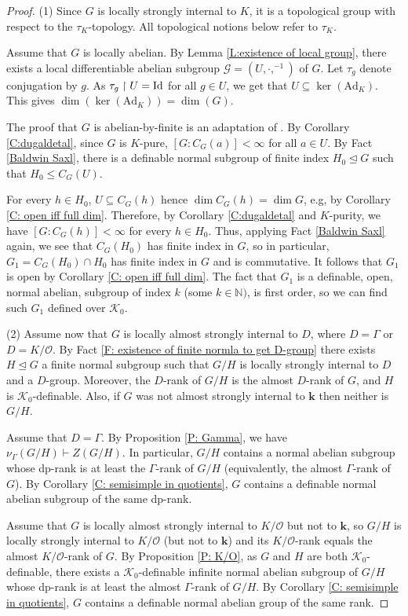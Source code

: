 \documentclass[11pt]{amsart}
\theoremstyle{definition}
\newcommand{\Nn}{{\mathbb{N}}}
\newcommand{\bk}{\textbf{k}}
\newcommand{\CK}{{\mathcal K}}
\newcommand{\CO}{{\mathcal O}}
\newcommand{\CG}{{\mathcal G}}
\newcommand{\0}{\emptyset}
\newcommand{\rest}{\upharpoonright}
\newcommand{\ad}{\mathrm{Ad}}
\def\sub{\subseteq}
\begin{document}
\begin{proof} 
(1)   Since $G$ is locally strongly internal to $K$, it is a topological group with respect to the $\tau_K$-topology. All topological notions below refer to $\tau_K$.

 Assume that $G$ is locally abelian.
     By Lemma \ref{L:existence of local group}, there exists a local differentiable abelian subgroup $\CG=(U,\cdot, ^{-1})$ of $G$. Let $\tau_g$ denote conjugation by $g$. As $\tau_g\rest U=\id$ for all $g\in U$, we get that $U\subseteq \ker(\ad_K)$. This gives $\dim(\ker(\ad_K))=\dim(G)$.   
     
     The proof that $G$ is abelian-by-finite is an  adaptation of \cite[Proposition 2.3]{PiYao}. By Corollary \ref{C:dugaldetal}, since $G$ is $K$-pure, $[G:C_G(a)]<\infty$ for all $a\in U$. %
     By Fact \ref{Baldwin Saxl}, there is a definable normal subgroup of finite index $H_0\trianglelefteq G$ such that $H_0\leq C_G(U)$. 
     
     For every $h\in H_0$, $U\sub C_G(h)$ hence $\dim C_G(h)=\dim G$, e.g, by Corollary \ref{C: open iff full dim}. Therefore,    by  Corollary \ref{C:dugaldetal} and $K$-purity, we have $[G:C_G(h)]<\infty$ for every $h\in H_0$. Thus, applying Fact \ref{Baldwin Saxl} again, we see that  $C_G(H_0)$ has finite index in $G$, so in particular,  $G_1=C_G(H_0)\cap H_0$ has finite index in $G$ and is commutative. It follows that $G_1$ is open by Corollary \ref{C: open iff full dim}. The fact that $G_1$ is a definable, open, normal abelian, subgroup of index $k$ (some $k\in \Nn)$, is first order, so we can find such $G_1$ defined over  $\CK_0$. 

    (2) Assume now that $G$ is locally almost strongly internal to $D$, where $D=\Gamma$ or $D=K/\CO$. By  Fact \ref{F: existence of finite normla to get D-group} there exists $H\trianglelefteq G$ a finite normal subgroup such that  $G/H$ is locally strongly internal to $D$ and a $D$-group. Moreover, the $D$-rank of $G/H$ is the almost $D$-rank of $G$, and $H$ is $\CK_0$-definable. Also, if $G$ was not almost strongly internal to $\bk$ then neither is $G/H$. 

    
    Assume  that $D=\Gamma$. By Proposition  \ref{P: Gamma}, we have $\nu_{\Gamma}(G/H)\vdash Z(G/H)$. In particular, $G/H$ contains a normal abelian subgroup whose dp-rank is at least the $\Gamma$-rank of $G/H$ (equivalently, the almost $\Gamma$-rank of $G$). By Corollary \ref{C: semisimple in quotients}, $G$ contains a definable normal abelian subgroup of the same dp-rank.
    
    Assume that $G$ is locally almost strongly internal to $K/\CO$ but not to $\bk$, so $G/H$ is locally strongly internal to $K/\CO$ (but not to $\bk$) and its $K/\CO$-rank equals the almost  $K/\CO$-rank of $G$. By Proposition \ref{P: K/O}, as $G$ and $H$ are both $\CK_0$-definable, there exists a $\CK_0$-definable infinite normal abelian subgroup of  $G/H$ whose dp-rank is at least the almost $\Gamma$-rank of $G/H$.
    By Corollary \ref{C: semisimple in quotients}, $G$ contains a definable normal abelian group of the same rank.
\end{proof}
\end{document}
